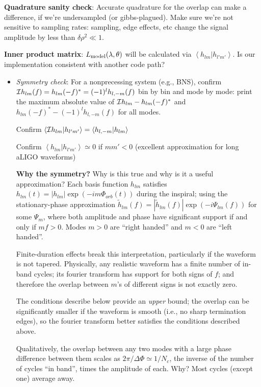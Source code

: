 \documentclass[twocolumn,prd,nofootinbib]{revtex4}
\newcommand\ForRichardOnly[1]{}
\newcommand\qmstateproduct[2]{\left\langle#1|#2\right\rangle}
\begin{document}
\begin{widetext}
\noindent \textbf{Quadrature sanity check}: Accurate quadrature for the overlap can make a difference, if we're
undersampled (or gibbs-plagued). Make sure we're not sensitive to sampling rates: sampling, edge effects, etc change the
signal amplitude by less than $\delta \rho^2 \ll 1$.

\noindent \textbf{Inner product matrix}: $L_{\rm model}(\lambda,\theta)$ will be calculated via
$\qmstateproduct{h_{lm}}{h_{l'm'}}$.  Is our implementation consistent with another code path?
\begin{itemize}
\item \emph{Symmetry check}:  For a nonprecessing system (e.g., BNS), confirm ${\cal I}h_{lm}(f) =
  h_{lm}(-f)^*=(-1)^lh_{l,-m}(f)$ bin by bin and mode by mode: print the maximum absolute value of ${\cal I}h_{lm}  -
  h_{lm}(-f)^*$ and $h_{lm}(-f)^* -(-1)^l h_{l,-m}(f)$ for all modes.

Confirm  $\qmstateproduct{{\cal I} h_{lm}}{h_{l'm'}} = \qmstateproduct{h_{l,-m}}{h_{lm}}$

Confirm $\qmstateproduct{h_{lm}}{h_{l'm'}}\simeq 0$ if $m m' <0$  (excellent approximation for long aLIGO
waveforms)%
\begin{shaded}
\noindent \textbf{Why the symmetry?} Why is this true and why is it a useful approximation? Each basis function $h_{lm}$ satisfies $h_{lm}(t)=
|h_{lm}|\exp(-i m\Phi_{orb}(t))$ during the inspiral; using the stationary-phase approximation $\tilde{h}_{lm}(f) =
|\tilde{h}_{lm}(f)|\exp(-i \Psi_{lm}(f) )$ for some $\Psi_m$, where both amplitude and phase have significant support if
and only if $m f>0$.  Modes $m>0$ are ``right handed'' and $m<0$ are ``left handed''.  

Finite-duration effects break this interpretation, particularly if the waveform is not tapered.  Physically,  any realistic waveform has a finite number of in-band cycles; its
fourier transform has support for both signs of $f$; and therefore the overlap between $m$'s of different signs is not
exactly zero.  

The  conditions describe below provide an \emph{upper} bound; the overlap can be significantly smaller if the waveform is smooth (i.e., no
sharp termination edges), so the fourier transform better satisfies the conditions described above.

Qualitatively,  the overlap between any two modes with a large phase difference between them scales as $2\pi/\Delta \Phi
\simeq 1/N_c$, the inverse of the number of cycles ``in band'', times the amplitude of each.  Why? Most cycles (except one) average
away.   
\ForRichardOnly{
Approximating the overlap in the neighborhood of the local maximum, we find
\begin{eqnarray}
\qmstateproduct{h_{lm}}{h_{l'm'}} = 2\int df e^{-i\Delta\Psi(f)} \frac{|\tilde{h}_{lm}(f)\tilde{h}_{l'm'}(f)|}{S_h} \simeq
\frac{|\tilde{h}_{lm}(f_*)\tilde{h}_{l'm'}(f_*)|e^{i\Delta\Psi}}{S_h}\frac{1}{\sqrt{i \pi \frac{d^2\Delta \Psi}{df^2}}}
\end{eqnarray}
}


\end{shaded}
\end{itemize}
\end{widetext}
\end{document}
